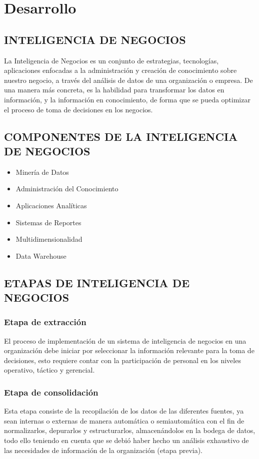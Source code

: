 \documentclass[twoside,twocolumn]{article}
\begin{document}
\section{Desarrollo}

\subsection{INTELIGENCIA DE NEGOCIOS}
La Inteligencia de Negocios es un conjunto de estrategias, tecnologías, aplicaciones enfocadas a la administración y creación de conocimiento sobre nuestro negocio, a través del análisis de datos de una organización o empresa. De una manera más concreta, es la habilidad para transformar los datos en información, y la información en conocimiento, de forma que se pueda optimizar el proceso de toma de decisiones en los negocios.

\subsection{COMPONENTES DE LA INTELIGENCIA DE NEGOCIOS}
\begin{itemize}
    \item  Minería de Datos
    \item  Administración del Conocimiento
    \item  Aplicaciones Analíticas
    \item  Sistemas de Reportes
    \item  Multidimensionalidad
    \item  Data Warehouse   
\end{itemize}

\subsection{ETAPAS DE INTELIGENCIA DE NEGOCIOS}
\subsubsection{Etapa de extracción}
El proceso de implementación de un sistema de inteligencia de negocios en una organización debe iniciar por seleccionar la información relevante para la toma de decisiones, esto requiere contar con la participación de personal en los niveles operativo, táctico y gerencial.
\subsubsection{Etapa de consolidación}
Esta etapa consiste de la recopilación de los datos de las diferentes fuentes, ya sean internas o externas de manera automática o semiautomática con el fin de normalizarlos, depurarlos y estructurarlos, almacenándolos en la bodega de datos, todo ello teniendo en cuenta que se debió haber hecho un análisis exhaustivo de las necesidades de información de la organización (etapa previa).
\end{document}
